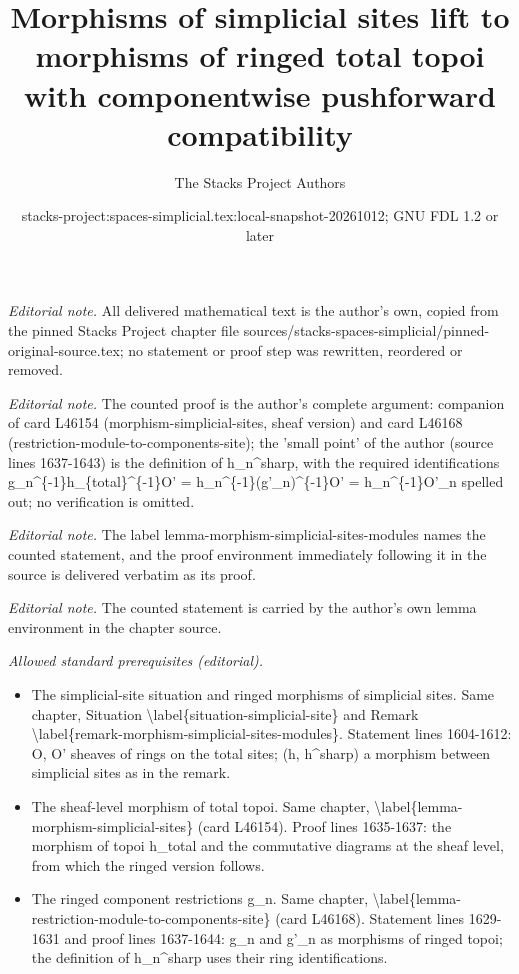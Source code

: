 \documentclass{stacks-project}
\title{Morphisms of simplicial sites lift to morphisms of ringed total topoi with componentwise pushforward compatibility}
\author{The Stacks Project Authors}
\date{stacks-project:spaces-simplicial.tex:local-snapshot-20261012; GNU FDL 1.2 or later}
\theoremstyle{plain}
\theoremstyle{definition}
\theoremstyle{remark}
\numberwithin{equation}{subsection}
\begin{document}
\maketitle
\noindent\textit{Editorial note.} All delivered mathematical text is the author's own, copied from the pinned Stacks Project chapter file sources/stacks-spaces-simplicial/pinned-original-source.tex; no statement or proof step was rewritten, reordered or removed.\par\medskip
\noindent\textit{Editorial note.} The counted proof is the author's complete argument: companion of card L46154 (morphism-simplicial-sites, sheaf version) and card L46168 (restriction-module-to-components-site); the 'small point' of the author (source lines 1637-1643) is the definition of h\_n\textasciicircum{}sharp, with the required identifications g\_n\textasciicircum{}\{-1\}h\_\{total\}\textasciicircum{}\{-1\}O' = h\_n\textasciicircum{}\{-1\}(g'\_n)\textasciicircum{}\{-1\}O' = h\_n\textasciicircum{}\{-1\}O'\_n spelled out; no verification is omitted.\par\medskip
\noindent\textit{Editorial note.} The label lemma-morphism-simplicial-sites-modules names the counted statement, and the proof environment immediately following it in the source is delivered verbatim as its proof.\par\medskip
\noindent\textit{Editorial note.} The counted statement is carried by the author's own lemma environment in the chapter source.\par\medskip
\noindent\textit{Allowed standard prerequisites (editorial).}\begin{itemize}
\item The simplicial-site situation and ringed morphisms of simplicial sites. Same chapter, Situation \textbackslash{}label\{situation-simplicial-site\} and Remark \textbackslash{}label\{remark-morphism-simplicial-sites-modules\}. Statement lines 1604-1612: O, O' sheaves of rings on the total sites; (h, h\textasciicircum{}sharp) a morphism between simplicial sites as in the remark.
\item The sheaf-level morphism of total topoi. Same chapter, \textbackslash{}label\{lemma-morphism-simplicial-sites\} (card L46154). Proof lines 1635-1637: the morphism of topoi h\_total and the commutative diagrams at the sheaf level, from which the ringed version follows.
\item The ringed component restrictions g\_n. Same chapter, \textbackslash{}label\{lemma-restriction-module-to-components-site\} (card L46168). Statement lines 1629-1631 and proof lines 1637-1644: g\_n and g'\_n as morphisms of ringed topoi; the definition of h\_n\textasciicircum{}sharp uses their ring identifications.
\end{itemize}\medskip
\end{document}

